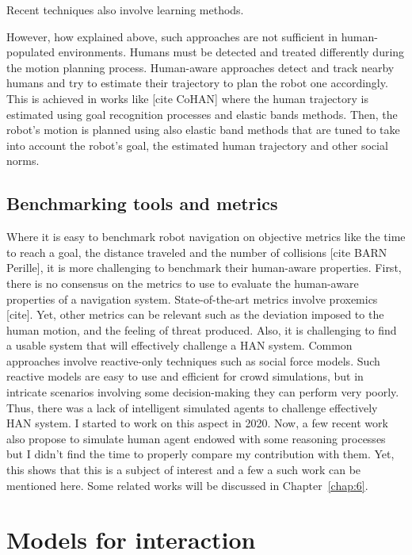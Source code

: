 Recent techniques also involve learning methods.

However, how explained above, such approaches are not sufficient in human-populated environments. Humans must be detected and treated differently during the motion planning process. Human-aware approaches detect and track nearby humans and try to estimate their trajectory to plan the robot one accordingly. This is achieved in works like [cite CoHAN] where the human trajectory is estimated using goal recognition processes and elastic bands methods. Then, the robot's motion is planned using also elastic band methods that are tuned to take into account the robot's goal, the estimated human trajectory and other social norms.   

\subsection{Benchmarking tools and metrics}

Where it is easy to benchmark robot navigation on objective metrics like the time to reach a goal, the distance traveled and the number of collisions [cite BARN Perille], it is more challenging to benchmark their human-aware properties.
First, there is no consensus on the metrics to use to evaluate the human-aware properties of a navigation system. State-of-the-art metrics involve proxemics [cite]. Yet, other metrics can be relevant such as the deviation imposed to the human motion, and the feeling of threat produced.
Also, it is challenging to find a usable system that will effectively challenge a HAN system. 
Common approaches involve reactive-only techniques such as social force models. Such reactive models are easy to use and efficient for crowd simulations, but in intricate scenarios involving some decision-making they can perform very poorly. Thus, there was a lack of intelligent simulated agents to challenge effectively HAN system.
I started to work on this aspect in 2020. Now, a few recent work also propose to simulate human agent endowed with some reasoning processes but I didn't find the time to properly compare my contribution with them. Yet, this shows that this is a subject of interest and a few a such work can be mentioned here. Some related works will be discussed in Chapter~\ref{chap:6}.


\section{Models for interaction}

